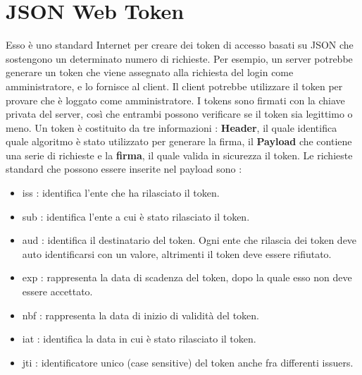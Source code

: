 \documentclass[12pt]{report}
\begin{document}
\section{JSON Web Token}
Esso è uno standard Internet per creare dei token di accesso basati su JSON che sostengono un determinato numero di richieste. Per esempio, un server potrebbe generare un token che viene assegnato alla richiesta del login come amministratore, e lo fornisce al client. Il client potrebbe utilizzare il token per provare che è loggato come amministratore. I tokens sono firmati con la chiave privata del server, così che entrambi possono verificare se il token sia legittimo o meno. Un token è costituito da tre informazioni : \textbf{Header}, il quale identifica quale algoritmo è stato utilizzato per generare la firma, il \textbf{Payload} che contiene una serie di richieste e la \textbf{firma}, il quale valida in sicurezza il token. Le richieste standard che possono essere inserite nel payload sono :
\begin{itemize}
\item iss : identifica l'ente che ha rilasciato il token.
\item sub : identifica l'ente a cui è stato rilasciato il token.
\item aud : identifica il destinatario del token. Ogni ente che rilascia dei token deve auto identificarsi con un valore, altrimenti il token deve essere rifiutato.
\item exp : rappresenta la data di scadenza del token, dopo la quale esso non deve essere accettato.
\item nbf : rappresenta la data di inizio di validità del token.
\item iat : identifica la data in cui è stato rilasciato il token.
\item jti : identificatore unico (case sensitive) del token anche fra differenti issuers.
\end{itemize}
\end{document}
